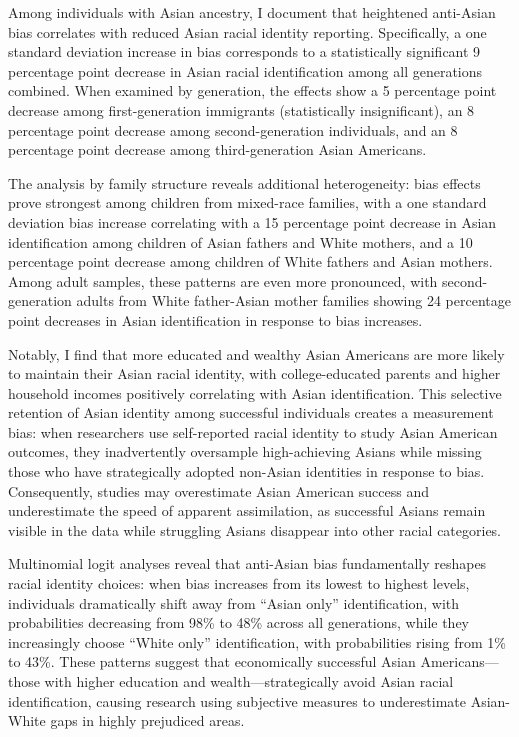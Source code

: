 Among individuals with Asian ancestry, I document that heightened anti-Asian bias correlates with reduced Asian racial identity reporting. Specifically, a one standard deviation increase in bias corresponds to a statistically significant 9 percentage point decrease in Asian racial identification among all generations combined. When examined by generation, the effects show a 5 percentage point decrease among first-generation immigrants (statistically insignificant), an 8 percentage point decrease among second-generation individuals, and an 8 percentage point decrease among third-generation Asian Americans. 

The analysis by family structure reveals additional heterogeneity: bias effects prove strongest among children from mixed-race families, with a one standard deviation bias increase correlating with a 15 percentage point decrease in Asian identification among children of Asian fathers and White mothers, and a 10 percentage point decrease among children of White fathers and Asian mothers. Among adult samples, these patterns are even more pronounced, with second-generation adults from White father-Asian mother families showing 24 percentage point decreases in Asian identification in response to bias increases.

Notably, I find that more educated and wealthy Asian Americans are more likely to maintain their Asian racial identity, with college-educated parents and higher household incomes positively correlating with Asian identification. This selective retention of Asian identity among successful individuals creates a measurement bias: when researchers use self-reported racial identity to study Asian American outcomes, they inadvertently oversample high-achieving Asians while missing those who have strategically adopted non-Asian identities in response to bias. Consequently, studies may overestimate Asian American success and underestimate the speed of apparent assimilation, as successful Asians remain visible in the data while struggling Asians disappear into other racial categories.

Multinomial logit analyses reveal that anti-Asian bias fundamentally reshapes racial identity choices: when bias increases from its lowest to highest levels, individuals dramatically shift away from ``Asian only'' identification, with probabilities decreasing from 98\% to 48\% across all generations, while they increasingly choose ``White only'' identification, with probabilities rising from 1\% to 43\%. These patterns suggest that economically successful Asian Americans—those with higher education and wealth—strategically avoid Asian racial identification, causing research using subjective measures to underestimate Asian-White gaps in highly prejudiced areas.


